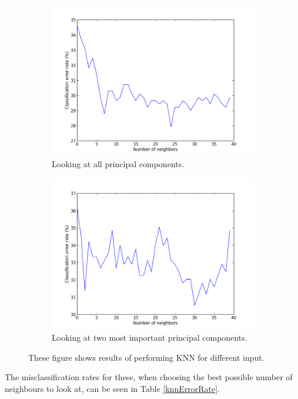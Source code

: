 \begin{figure}[H]
	\begin{subfigure}[b]{0.5\textwidth}
	\includegraphics[scale=0.3]{pictures/knnPC.png}
	\caption{Looking at all principal components.}
	\label{knnResultXPA}
	\end{subfigure}
	\begin{subfigure}[b]{0.5\textwidth}
	\includegraphics[scale=0.3]{pictures/knn2PC.png}
	\caption{Looking at two most important principal components.}
	\label{knnResultX2PA}
	\end{subfigure}
\caption{These figure shows results of performing KNN for different input.}
\label{knnResults}
\end{figure}

The misclassification rates for these, when choosing the best possible number of neighbours to look at, can be seen in Table \ref{knnErrorRate}.


